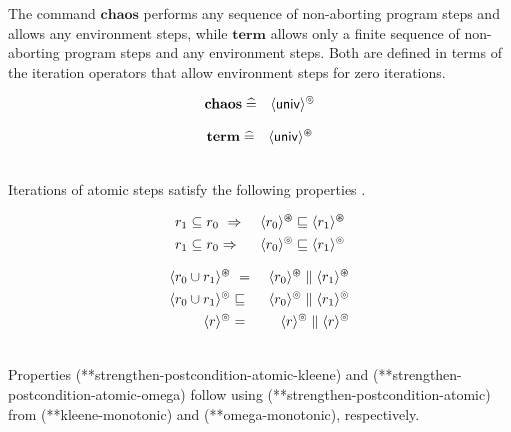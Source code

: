 \documentclass[fleqn]{fac}
\makeatletter
\newcommand{\labelproperty}[1]{\label{property-#1}\index{Property!#1|PropertyDef{\ref{property-#1}}}}
\def\refproperty{\@ifnextchar*{\@refproperty}{\@@refproperty}}
\def\@refproperty*#1{\ref{property-#1}\index{Property!#1|LawUse}}
\def\@@refproperty#1{property~(\ref{property-#1})\index{Property!#1|LawUse}}
\newcommand{\atomicrel}[1]{\langle#1\rangle}
\newcommand{\FinSkipIter}{^{\varoast}}
\newcommand{\FinGuar}[1]{\atomicrel{#1}\FinSkipIter}
\newcommand{\omegaskip}{\circledcirc}
\newcommand{\InfSkipIter}{^{\omegaskip}}
\newcommand{\InfGuar}[1]{\atomicrel{#1}\InfSkipIter}
\newcommand{\sdefs}{\mathrel{\widehat=}}\newcommand{\spot}{\mathrel{{\cdot}}}\newcommand{\where}{\mathrel{|}}\renewcommand{\implies}{\mathrel{\Rightarrow}}\newcommand{\emptyrel}{\emptyset}
\newcommand{\universalrel}{\mathsf{univ}}
\newcommand{\relcontained}{\subseteq}
\newcommand{\Keyword}[1]{\mathsf{\mathbf{#1}}}
\newcommand{\Chaos}{\Keyword{chaos}}
\newcommand{\Term}{\Keyword{term}}
\makeatother
\begin{document}
The command
$\Chaos$ performs any sequence of non-aborting program steps and allows any environment steps,
while
$\Term$ allows only a finite sequence of non-aborting program steps and any environment steps.
Both are defined in terms of the iteration operators that allow environment steps for zero iterations.
\vspace*{-2ex}
\\
\begin{minipage}[t]{0.5\textwidth}
\begin{eqnarray}
  \Chaos & \sdefs & \InfGuar{\universalrel}  \labelproperty{semantics-chaos} 
\end{eqnarray}\end{minipage}
\begin{minipage}[t]{0.49\textwidth}
\begin{eqnarray}
  \Term   & \sdefs & \FinGuar{\universalrel}  \labelproperty{semantics-term} 
\end{eqnarray}
\end{minipage}
\vspace{1ex}
\\
Iterations of atomic steps satisfy the following properties \cite{HayesJonesColvin14TR}.\\[-2ex]
\begin{minipage}[t]{0.5\textwidth}
\begin{eqnarray}
  r_1 \relcontained r_0 & ~\implies~ & \FinGuar{r_0} \refsto \FinGuar{r_1}  
    \labelproperty{strengthen-postcondition-atomic-kleene} \\
  r_1 \relcontained r_0 & \implies & \InfGuar{r_0} \refsto \InfGuar{r_1}  
    \labelproperty{strengthen-postcondition-atomic-omega} 
\end{eqnarray}
\end{minipage}
\begin{minipage}[t]{0.49\textwidth}
\begin{eqnarray}
  \FinGuar{r_0 \cup r_1} & ~=~ &  \FinGuar{r_0} \parallel \FinGuar{r_1}
    \labelproperty{parallel-atomic-kleene} \\
  \InfGuar{r_0 \cup r_1} & \refsto & \InfGuar{r_0} \parallel \InfGuar{r_1}
    \labelproperty{parallel-atomic-omega2} \\
  \InfGuar{r} & = & \InfGuar{r} \parallel \InfGuar{r}
    \labelproperty{parallel-atomic-omega1} 
\end{eqnarray}
\end{minipage}\vspace{1ex}\\
Properties (\refproperty*{strengthen-postcondition-atomic-kleene}) and (\refproperty*{strengthen-postcondition-atomic-omega}) 
follow using (\refproperty*{strengthen-postcondition-atomic}) from 
(\refproperty*{kleene-monotonic}) and (\refproperty*{omega-monotonic}), respectively.
\end{document}

